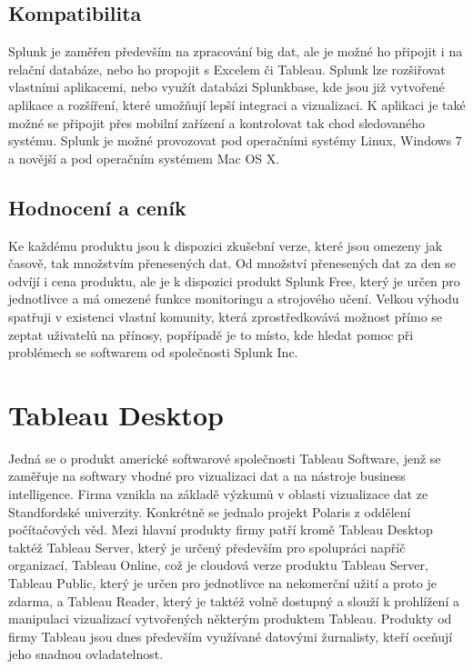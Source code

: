 \documentclass[czech,BP]{thesiskiv}
\begin{document}
\subsection{Kompatibilita}
Splunk je zaměřen především na zpracování big dat, ale je možné ho připojit i na relační databáze, nebo ho propojit s Excelem či Tableau. Splunk lze rozšiřovat vlastními aplikacemi, nebo využít databázi Splunkbase, kde jsou již vytvořené aplikace a rozšíření, které umožňují lepší integraci a vizualizaci. K aplikaci je také možné se připojit přes mobilní zařízení a kontrolovat tak chod sledovaného systému. Splunk je možné provozovat pod operačními systémy Linux, Windows 7 a novější a pod operačním systémem Mac OS X. \cite{Splunk_a_kompatibilita}

\subsection{Hodnocení a ceník}
 Ke každému produktu jsou k dispozici zkušební verze, které jsou omezeny jak časově, tak množstvím přenesených dat. Od množství přenesených dat za den se odvíjí i cena produktu, ale je k dispozici produkt Splunk Free, který je určen pro jednotlivce a má omezené funkce monitoringu a strojového učení. Velkou výhodu spatřuji v existenci vlastní komunity, která zprostředkovává možnost přímo se zeptat uživatelů na přínosy, popřípadě je to místo, kde hledat pomoc při problémech se softwarem od společnosti Splunk Inc.
 
 \section{Tableau Desktop}
 Jedná se o produkt americké softwarové společnosti Tableau Software, jenž se zaměřuje na softwary vhodné pro vizualizaci dat a na nástroje business intelligence. Firma vznikla na základě výzkumů v oblasti vizualizace dat ze Standfordské univerzity. Konkrétně se jednalo projekt Polaris z oddělení počítačových věd.\cite{TableauHistory} Mezi hlavní produkty firmy patří kromě Tableau Desktop taktéž Tableau Server, který je určený především pro spolupráci napříč organizací, Tableau Online, což je cloudová verze produktu Tableau Server, Tableau Public, který je určen pro jednotlivce na nekomerční užití a proto je zdarma, a Tableau Reader, který je taktéž volně dostupný a slouží k prohlížení a manipulaci vizualizací vytvořených některým produktem Tableau. Produkty od firmy Tableau jsou dnes především využívané datovými žurnalisty, kteří oceňují jeho snadnou ovladatelnost.
 
\end{document}
